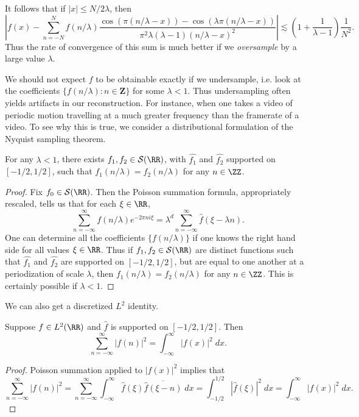 %
It follows that if $|x| \leq N/2\lambda$, then
%
\[ \left| f(x) - \sum_{n = -N}^N f(n/\lambda) \frac{\cos(\pi (n / \lambda - x)) - \cos(\lambda \pi (n / \lambda - x))}{\pi^2 \lambda (\lambda - 1)(n/\lambda - x)^2} \right| \lesssim \left( 1 + \frac{1}{\lambda - 1} \right) \frac{1}{N^2}. \]
%
Thus the rate of convergence of this sum is much better if we \emph{oversample} by a large value $\lambda$.

We should not expect $f$ to be obtainable exactly if we undersample, i.e. look at the coefficients $\{ f(n/\lambda) : n \in \mathbf{Z} \}$ for some $\lambda < 1$. Thus undersampling often yields artifacts in our reconstruction. For instance, when one takes a video of periodic motion travelling at a much greater frequency than the framerate of a video. To see why this is true, we consider a distributional formulation of the Nyquist sampling theorem.

\begin{theorem}
    For any $\lambda < 1$, there exists $f_1,f_2 \in \mathcal{S}(\RR)$, with $\widehat{f_1}$ and $\widehat{f_2}$ supported on $[-1/2,1/2]$, such that $f_1(n/\lambda) = f_2(n/\lambda)$ for any $n \in \ZZ$.
\end{theorem}
\begin{proof}
    Fix $f_0 \in \mathcal{S}(\RR)$. Then the Poisson summation formula, appropriately rescaled, tells us that for each $\xi \in \RR$,
    \[ \sum_{n = -\infty}^\infty f(n/\lambda) e^{-2 \pi n i \xi} = \lambda^d \sum_{n = -\infty}^\infty \widehat{f}(\xi - \lambda n). \]
    One can determine all the coefficients $\{ f(n/\lambda) \}$ if one knows the right hand side for all values $\xi \in \RR$. Thus if $f_1,f_2 \in \mathcal{S}(\RR)$ are distinct functions such that $\widehat{f_1}$ and $\widehat{f_2}$ are supported on $[-1/2,1/2]$, but are equal to one another at a periodization of scale $\lambda$, then $f_1(n/\lambda) = f_2(n/\lambda)$ for any $n \in \ZZ$. This is certainly possible if $\lambda < 1$.
\end{proof}

We can also get a discretized $L^2$ identity.

\begin{theorem}
    Suppose $f \in L^2(\RR)$ and $\widehat{f}$ is supported on $[-1/2,1/2]$. Then
    \[ \sum_{n = -\infty}^\infty |f(n)|^2 = \int_{-\infty}^\infty |f(x)|^2\; dx. \]
\end{theorem}
\begin{proof}
    Poisson summation applied to $|f(x)|^2$ implies that
    \[ \sum_{n = -\infty}^\infty |f(n)|^2 = \sum_{n = -\infty}^\infty \int_{-\infty}^\infty \widehat{f}(\xi) \overline{\widehat{f}(\xi - n)}\; dx = \int_{-1/2}^{1/2} |\widehat{f}(\xi)|^2\; dx = \int_{-\infty}^\infty |f(x)|^2\; dx. \]
\end{proof}

